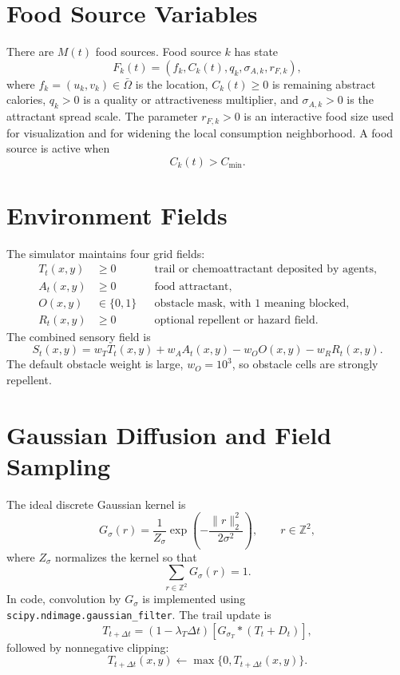 \documentclass[11pt]{article}
\begin{document}
\section{Food Source Variables}
There are $M(t)$ food sources. Food source $k$ has state
\begin{equation}
  F_k(t)=\left(f_k,C_k(t),q_k,\sigma_{A,k},r_{F,k}\right),
\end{equation}
where $f_k=(u_k,v_k)\in\bar{\Omega}$ is the location, $C_k(t)\ge 0$ is remaining
abstract calories, $q_k>0$ is a quality or attractiveness multiplier, and
$\sigma_{A,k}>0$ is the attractant spread scale. The parameter $r_{F,k}>0$ is
an interactive food size used for visualization and for widening the local
consumption neighborhood. A food source is active when
\begin{equation}
  C_k(t)>C_{\min}.
\end{equation}

\section{Environment Fields}
The simulator maintains four grid fields:
\begin{align}
  T_t(x,y)&\ge 0 && \text{trail or chemoattractant deposited by agents},\\
  A_t(x,y)&\ge 0 && \text{food attractant},\\
  O(x,y)&\in\{0,1\} && \text{obstacle mask, with 1 meaning blocked},\\
  R_t(x,y)&\ge 0 && \text{optional repellent or hazard field}.
\end{align}
The combined sensory field is
\begin{equation}
  S_t(x,y)=w_TT_t(x,y)+w_AA_t(x,y)-w_OO(x,y)-w_RR_t(x,y).
\end{equation}
The default obstacle weight is large, $w_O=10^3$, so obstacle cells are strongly
repellent.

\section{Gaussian Diffusion and Field Sampling}
The ideal discrete Gaussian kernel is
\begin{equation}
  G_\sigma(r)=\frac{1}{Z_\sigma}\exp\left(-\frac{\|r\|_2^2}{2\sigma^2}\right),
  \qquad r\in\mathbb{Z}^2,
\end{equation}
where $Z_\sigma$ normalizes the kernel so that
\begin{equation}
  \sum_{r\in\mathbb{Z}^2}G_\sigma(r)=1.
\end{equation}
In code, convolution by $G_\sigma$ is implemented using
\texttt{scipy.ndimage.gaussian\_filter}. The trail update is
\begin{equation}
  T_{t+\Delta t}=(1-\lambda_T\Delta t)
  \left[G_{\sigma_T}*(T_t+D_t)\right],
\end{equation}
followed by nonnegative clipping:
\begin{equation}
  T_{t+\Delta t}(x,y)\leftarrow \max\{0,T_{t+\Delta t}(x,y)\}.
\end{equation}
\end{document}
